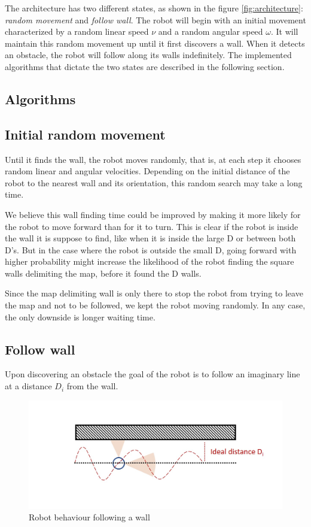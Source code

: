 \documentclass[10pt,journal,compsoc]{IEEEtran}
\begin{document}
The architecture has two different states, as shown in the figure \ref{fig:architecture}: \textit{random movement} and \textit{follow wall}. The robot will begin with an initial movement characterized by a random linear speed $\nu$ and a random angular speed $\omega$. It will maintain this random movement up until it first discovers a wall. When it detects an obstacle, the robot will follow along its walls indefinitely. The implemented algorithms that dictate the two states are described in the following section. 


\subsection{Algorithms}
\subsection{Initial random movement}\label{subsec:initial}

Until it finds the wall, the robot moves randomly, that is, at each step it chooses random linear and angular velocities. Depending on the initial distance of the robot to the nearest wall and its orientation, this random search may take a long time. 

We believe this wall finding time could be improved by making it more likely for the robot to move forward than for it to turn. This is clear if the robot is inside the wall it is suppose to find, like when it is inside the large D or between both D's. But in the case where the robot is outside the small D, going forward with higher probability might increase the likelihood of the robot finding the square walls delimiting the map, before it found the D walls.

Since the map delimiting wall is only there to stop the robot from trying to leave the map and not to be followed, we kept the robot moving randomly. In any case, the only downside is longer waiting time.

\subsection{Follow wall}
Upon discovering an obstacle the goal of the robot is to follow an imaginary line at a distance $D_i$ from the wall. 

   \begin{figure}[thpb]
      \centering
     \includegraphics[scale=0.3]{img/behaviour.jpg}
      \caption{Robot behaviour following a wall}
      \label{fig:wall}
   \end{figure}
\end{document}
